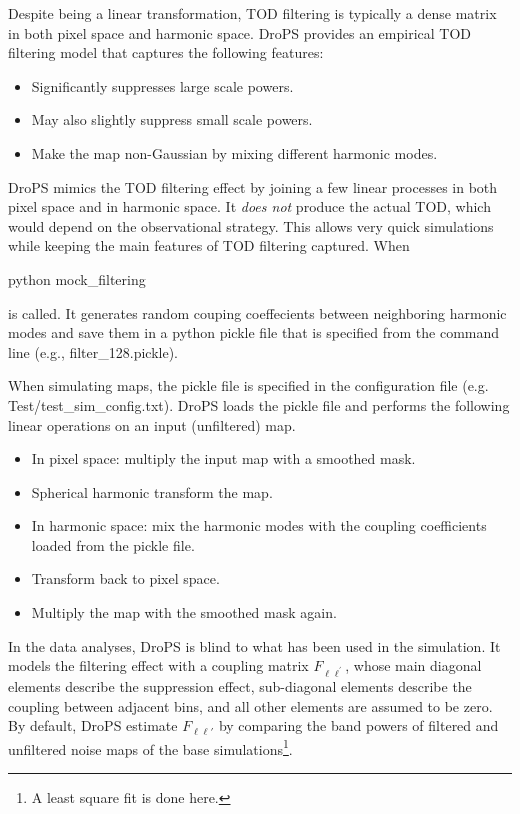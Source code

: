 \documentclass[12pt, a4paper]{ctexart} %
\def\tbox#1{\begin{tcolorbox}#1\end{tcolorbox}}
\begin{document}
Despite being a linear transformation, TOD filtering is typically a dense matrix in both pixel space and harmonic space. DroPS provides an empirical TOD filtering model that captures the following features:
\begin{itemize}
  \item{Significantly suppresses large scale powers.}
  \item{May also slightly suppress small scale powers.}
  \item{Make the map non-Gaussian by mixing different harmonic modes.}      
\end{itemize}
DroPS mimics the TOD filtering effect by joining a few linear processes in both pixel space and in harmonic space. It {\it does not} produce the actual TOD, which would depend on the observational strategy. This allows very quick simulations while keeping the main features of TOD filtering captured.
When
\tbox{python mock\_filtering}
is called. It generates random couping coeffecients between neighboring harmonic modes and save them in a python pickle file that is specified from the command line (e.g., filter\_128.pickle).

When simulating maps, the pickle file is specified in the configuration file (e.g. Test/test\_sim\_config.txt). DroPS loads the pickle file and performs the following linear operations on an input (unfiltered) map.
\begin{itemize}
\item{In pixel space: multiply the input map with a smoothed mask.}
\item{Spherical harmonic transform the map.}  
\item{In harmonic space: mix the harmonic modes with the coupling coefficients loaded from the pickle file.}
\item{Transform back to pixel space.}
\item{Multiply the map with the smoothed mask again.}
\end{itemize}


In the data analyses, DroPS is blind to what has been used in the simulation. It models the filtering effect with a coupling matrix $F_{\ell\ell^\prime}$, whose main diagonal elements describe the suppression effect, sub-diagonal elements describe the coupling between adjacent bins, and all other elements are assumed to be zero. By default, DroPS estimate $F_{\ell\ell'}$ by comparing the band powers of filtered and unfiltered noise maps of the base simulations\footnote{A least square fit is done here.}.
\end{document}
